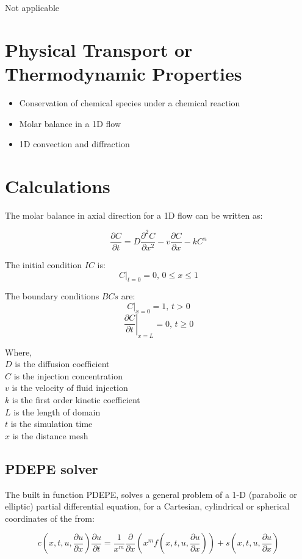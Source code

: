 \documentclass{article}
\begin{document}
Not applicable

\section{Physical Transport or Thermodynamic Properties}

\begin{itemize}
\item Conservation of chemical species under a chemical reaction
\item Molar balance in a 1D flow
\item 1D convection and diffraction
\end{itemize}

\section{Calculations}

The molar balance in axial direction for a 1D flow can be written as:

$$ \frac{\partial C}{\partial t} = D \frac{\partial^2 C}{\partial x^2} - v \frac{\partial C}{\partial x} - k C^n $$

The initial condition $IC$ is:
$$ \left. C \right|_{t = 0} = 0 \textrm{, } 0 \leq x \leq 1 $$

The boundary conditions $BCs$ are:
$$ \left. C \right|_{x = 0} = 1 \textrm{, } t > 0 $$
$$ \left. \frac{\partial C}{\partial t} \right|_{x = L} = 0 \textrm{, } t \geq 0 $$

Where, \\
$D$ is the diffusion coefficient \\
$C$ is the injection concentration \\
$v$ is the velocity of fluid injection \\
$k$ is the first order kinetic coefficient \\
$L$ is the length of domain \\
$t$ is the simulation time \\
$x$ is the distance mesh

\subsection{PDEPE solver}

The built in function PDEPE, solves a general problem of a 1-D (parabolic or elliptic) partial differential equation, for a Cartesian, cylindrical or spherical coordinates of the from:

$$ c \left( x, t, u, \frac{\partial u}{\partial x} \right) \frac{\partial u}{\partial t} = \frac{1}{x^m} \frac{\partial}{\partial x} \left( x^m f \left( x, t, u, \frac{\partial u}{\partial x} \right) \right) + s \left( x, t, u, \frac{\partial u}{\partial x} \right) $$
\end{document}

